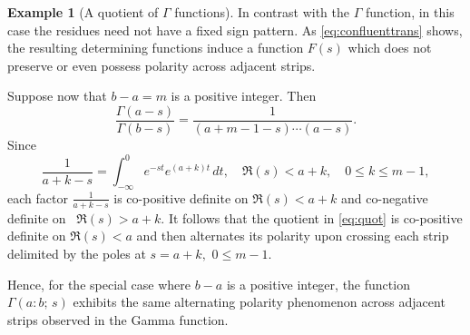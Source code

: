 \documentclass[12pt]{article}
\theoremstyle{definition}
\newtheorem{example}[theorem]{Example}
\begin{document}
\begin{example}[A quotient of $\Gamma$ functions]
In contrast with the $\Gamma$ function, in this case
the residues need not have a fixed sign pattern. 
As \eqref{eq:confluenttrans} shows, the resulting determining functions induce a function $F(s)$ which does not preserve or even possess polarity across adjacent strips.

Suppose now that $b-a=m$ is a positive integer. Then
\begin{equation}\label{eq:quot}
\frac{\Gamma(a-s)}{\Gamma(b-s)}
=
\frac{1}{(a+m-1-s)\cdots(a-s)}.
\end{equation}
Since \[\frac{1}{a+k-s}=\int_{-\infty}^{0}e^{-st}e^{(a+k)t}\,dt, \quad \Re(s)<a+k, \quad 0 \leq k \leq m-1,\] each factor $\frac{1}{a+k-s}$ is co-positive definite on $\Re(s)<a+k$ and co-negative definite on \mbox{ $\Re(s)>a+k.$} It follows that the quotient in \eqref{eq:quot} is co-positive definite on $\Re(s)<a$ and then alternates its polarity upon crossing each strip delimited by the poles at $s=a+k, \,\, 0 \leq m-1.$ 

\begin{center}

\end{center}



Hence, for the special case where $b-a$ is a positive integer, the function $\Gamma(a:b; \, s)$ exhibits the same alternating polarity phenomenon across adjacent strips observed in the Gamma function.

\end{example}
\end{document}
